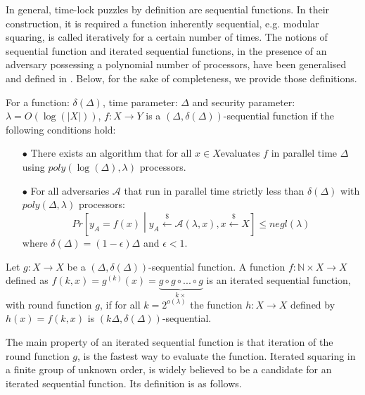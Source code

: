 



In general, time-lock puzzles by definition are sequential functions.  In their construction, it is required a  function inherently sequential, e.g. modular squaring, is called iteratively for a certain number of times.  The notions of sequential function and iterated sequential functions, in the presence of an adversary possessing a polynomial number of processors, have been generalised and defined in \cite{BonehBBF18}. Below, for the sake of completeness, we provide those  definitions. 


\begin{definition}
For a function: $\delta(\Delta)$, time parameter: $\Delta$ and security parameter: $\lambda=O(\log(|X|))$,  $f:X\rightarrow Y$ is a $(\Delta,\delta(\Delta))$-sequential function if the following conditions hold:
\begin{itemize}
\item[$\bullet$] There exists an algorithm that for all $x\in X$evaluates $f$ in parallel time $\Delta$ using $poly(\log(\Delta),\lambda)$ processors.
\item[$\bullet$] For all adversaries $\mathcal{A}$ that run in parallel time strictly less than $\delta(\Delta)$ with $poly(\Delta,\lambda)$ processors: 
$$Pr\left[y_{\scriptscriptstyle A}=f(x)\middle |  y_{\scriptscriptstyle A}\stackrel{\scriptscriptstyle \$}\leftarrow \mathcal {A}(\lambda,x), x\stackrel{\scriptscriptstyle \$}\leftarrow X\right]\leq negl(\lambda)$$
where $\delta(\Delta)=(1-\epsilon)\Delta$ and $\epsilon<1$.
\end{itemize}
\end{definition}

\begin{definition} Let $g:X\rightarrow X$ be a $(\Delta,\delta(\Delta))$-sequential function. A function $f: \mathbb{N}\times X\rightarrow X$ defined as $f(k,x)=g^{\scriptscriptstyle (k)}(x)=\underbrace{g\circ g\circ... \circ g}_{\scriptscriptstyle k\times}$ is  an iterated sequential function, with round function $g$, if for all $k=2^{\scriptscriptstyle o(\lambda)}$ the function $h:X\rightarrow X$ defined by  $h(x)=f(k,x)$ is $(k\Delta,\delta(\Delta))$-sequential. 

\end{definition}

The main property of an iterated sequential function is that iteration of the round function $g$, is the fastest way to evaluate the function. Iterated squaring  in a finite group of unknown order, is widely believed to be a candidate for an iterated sequential function. Its definition is  as follows. 
